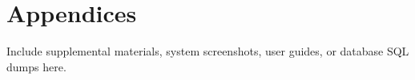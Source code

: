 \documentclass[12pt,a4paper]{report}
\begin{document}
\chapter*{Appendices}
Include supplemental materials, system screenshots, user guides, or database SQL dumps here.
\end{document}
